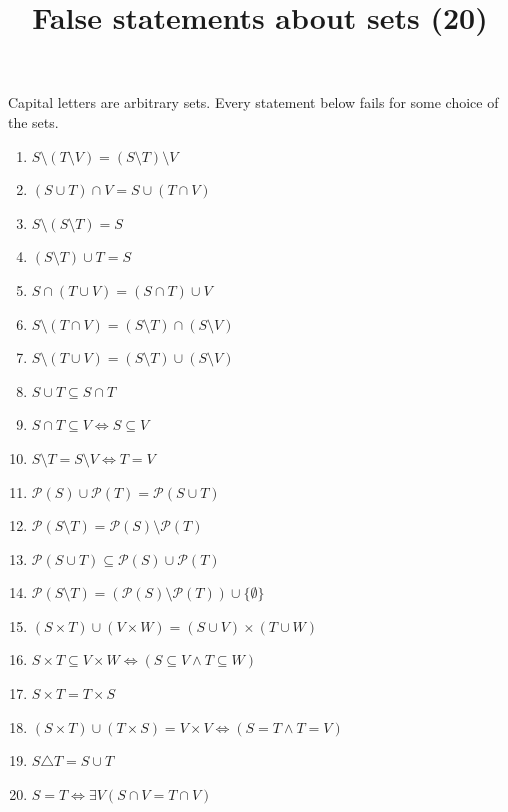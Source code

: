 \documentclass[11pt,a4paper]{article}
\title{False statements about sets (20)}
\author{}
\date{}
\begin{document}
\maketitle
Capital letters are arbitrary sets. Every statement below fails for some choice of the sets.

\begin{enumerate}
\item $\displaystyle S \setminus (T \setminus V) = (S \setminus T) \setminus V$
\item $\displaystyle (S \cup T) \cap V = S \cup (T \cap V)$
\item $\displaystyle S \setminus (S \setminus T) = S$
\item $\displaystyle (S \setminus T) \cup T = S$
\item $\displaystyle S \cap (T \cup V) = (S \cap T) \cup V$
\item $\displaystyle S \setminus (T \cap V) = (S \setminus T) \cap (S \setminus V)$
\item $\displaystyle S \setminus (T \cup V) = (S \setminus T) \cup (S \setminus V)$
\item $\displaystyle S \cup T \subseteq S \cap T$
\item $\displaystyle S \cap T \subseteq V \iff S \subseteq V$
\item $\displaystyle S \setminus T = S \setminus V \iff T = V$
\item $\displaystyle \mathcal{P}(S) \cup \mathcal{P}(T) = \mathcal{P}(S \cup T)$
\item $\displaystyle \mathcal{P}(S \setminus T) = \mathcal{P}(S) \setminus \mathcal{P}(T)$
\item $\displaystyle \mathcal{P}(S \cup T) \subseteq \mathcal{P}(S) \cup \mathcal{P}(T)$
\item $\displaystyle \mathcal{P}(S \setminus T) = (\mathcal{P}(S) \setminus \mathcal{P}(T)) \cup \{\emptyset\}$
\item $\displaystyle (S \times T) \cup (V \times W) = (S \cup V) \times (T \cup W)$
\item $\displaystyle S \times T \subseteq V \times W \iff (S \subseteq V \land T \subseteq W)$
\item $\displaystyle S \times T = T \times S$
\item $\displaystyle (S \times T) \cup (T \times S) = V \times V \iff (S = T \land T = V)$
\item $\displaystyle S \triangle T = S \cup T$
\item $\displaystyle S = T \iff \exists V \left( S \cap V = T \cap V \right)$
\end{enumerate}
\end{document}
